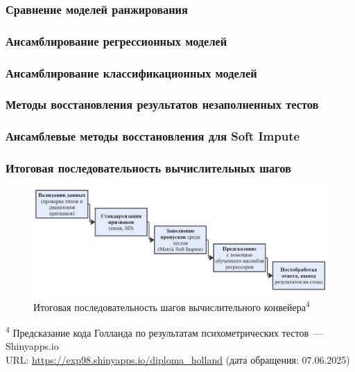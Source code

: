\documentclass
  [ russian
  , aspectratio=169 %
  ] {beamer}
\begin{document}
\begin{frame}
    \frametitle{Сравнение моделей ранжирования}
    
\end{frame}


\begin{frame}
    \frametitle{Ансамблирование регрессионных моделей}
    
    
\end{frame}


\begin{frame}
    \frametitle{Ансамблирование классификационных моделей}
    
    
\end{frame}


\begin{frame}
    \frametitle{Методы восстановления результатов незаполненных тестов}
    
\end{frame}


\begin{frame}
    \frametitle{Ансамблевые методы восстановления для Soft Impute}
    
\end{frame}


\begin{frame}
    \frametitle{Итоговая последовательность вычислительных шагов}
    
    \begin{figure}
        \centering
        \includegraphics[width=0.95\linewidth]{figures/final_pipeline.jpg}
        \caption{Итоговая последовательность шагов вычислительного конвейера\textsuperscript{4}}
        \label{fig:pipeline}
    \end{figure}


    \btVFill
    {\footnotesize \quad
        \textsuperscript{4} Предсказание кода Голланда по результатам психометрических тестов~--- Shinyapps.io\\
        \qquad URL: \url{https://exp98.shinyapps.io/diploma_holland} (дата обращения: 07.06.2025)
    }
\end{frame}
\end{document}
